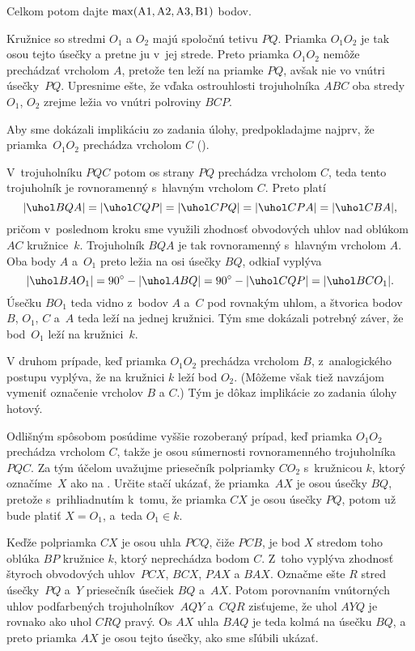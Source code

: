{\noindent
Celkom potom dajte $\rm \max(A1,A2,A3,B1)$ bodov.
\endschema
}

{%
Kružnice so stredmi $O_1$ a $O_2$ majú spoločnú tetivu $PQ$.
Priamka $O_1O_2$ je tak osou tejto úsečky a pretne ju v~jej strede.
Preto priamka $O_1O_2$ nemôže prechádzať vrcholom $A$,
pretože ten leží na priamke $PQ$, avšak nie vo vnútri úsečky~$PQ$.
Upresnime ešte, že vďaka ostrouhlosti trojuholníka $ABC$ oba
stredy $O_1$, $O_2$ zrejme ležia vo vnútri
polroviny $BCP$.

Aby sme dokázali implikáciu zo zadania úlohy,
predpokladajme najprv, že priamka~$O_1O_2$
prechádza vrcholom $C$ (\obr).
%

V~trojuholníku $PQC$ potom os strany $PQ$ prechádza vrcholom $C$, teda tento
trojuholník je rovnoramenný s~hlavným vrcholom $C$. Preto platí
$$
|\uhol BQA|=|\uhol CQP|=|\uhol CPQ|=|\uhol CPA|=|\uhol CBA|,
$$
pričom v~poslednom kroku sme využili zhodnosť obvodových uhlov
nad oblúkom $AC$ kružnice~$k$. Trojuholník $BQA$ je tak rovnoramenný
s~hlavným vrcholom $A$. Oba body $A$ a~$O_1$ preto ležia na
osi úsečky $BQ$, odkiaľ vyplýva
$$
|\uhol BAO_1| = 90^\circ-|\uhol ABQ|=90^\circ-|\uhol CQP|=|\uhol BCO_1|.
$$
Úsečku $BO_1$ teda vidno z~bodov $A$ a~$C$ pod rovnakým
uhlom, a štvorica bodov $B$, $O_1$, $C$ a~$A$ teda leží na jednej
kružnici.
Tým sme dokázali potrebný záver, že bod~$O_1$ leží na kružnici~$k$.

\smallskip
V druhom prípade, keď priamka $O_1O_2$ prechádza vrcholom $B$,
z~analogického postupu vyplýva, že na kružnici $k$ leží bod $O_2$.
(Môžeme však tiež navzájom vymeniť označenie vrcholov $B$ a $C$.)
Tým je dôkaz implikácie zo zadania úlohy hotový.

\ineriesenie
Odlišným spôsobom posúdime vyššie rozoberaný prípad,
keď priamka $O_1O_2$ prechádza vrcholom $C$, takže je osou
súmernosti rovnoramenného trojuholníka $PQC$. Za tým účelom
uvažujme priesečník polpriamky $CO_2$ s~kružnicou $k$,
ktorý označíme~$X$ ako na \obr{}.
Určite stačí ukázať, že priamka~$AX$ je osou úsečky $BQ$, pretože
s~prihliadnutím k~tomu, že priamka $CX$ je osou úsečky $PQ$,
potom už bude platiť $X=O_1$, a~teda $O_1\in k$.

Keďže polpriamka $CX$ je osou uhla $PCQ$, čiže $PCB$, je bod
$X$ stredom toho oblúka $BP$ kružnice $k$, ktorý neprechádza
bodom $C$. Z~toho vyplýva zhodnosť štyroch obvodových uhlov~$PCX$,
$BCX$, $PAX$ a $BAX$. Označme ešte $R$ stred úsečky~$PQ$ a~$Y$ priesečník úsečiek $BQ$ a~$AX$. Potom porovnaním vnútorných uhlov
podfarbených trojuholníkov~$AQY$ a~$CQR$ zisťujeme, že
uhol $AYQ$ je rovnako ako uhol $CRQ$ pravý.
Os $AX$ uhla $BAQ$ je teda kolmá na úsečku $BQ$,
a preto priamka $AX$ je osou tejto úsečky, ako sme sľúbili
ukázať.
%

}
